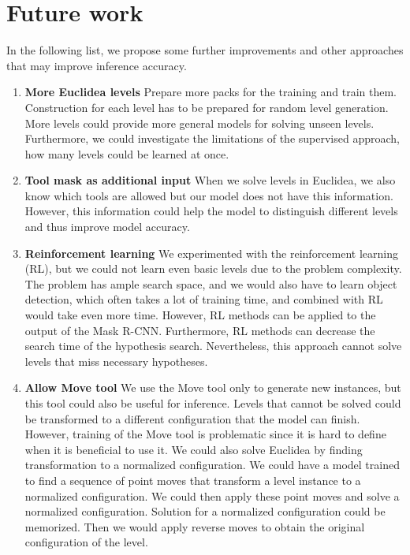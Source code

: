 \section{Future work}
In the following list, we propose some further improvements and other approaches that may improve inference accuracy. 
\begin{enumerate}
    \item \textbf{More Euclidea levels}\newline
    Prepare more packs for the training and train them. Construction for each level has to be prepared for random level generation. More levels could provide more general models for solving unseen levels. Furthermore, we could investigate the limitations of the supervised approach, how many levels could be learned at once.
    \item \textbf{Tool mask as additional input}\newline
    When we solve levels in Euclidea, we also know which tools are allowed but our model does not have this information. However, this information could help the model to distinguish different levels and thus improve model accuracy. 
    \item \textbf{Reinforcement learning}\newline
     We experimented with the reinforcement learning (RL), but we could not learn even basic levels due to the problem complexity. The problem has ample search space, and we would also have to learn object detection, which often takes a lot of training time, and combined with RL would take even more time. However, RL methods can be applied to the output of the Mask {R-CNN}. Furthermore, RL methods can decrease the search time of the hypothesis search. Nevertheless, this approach cannot solve levels that miss necessary hypotheses.
    \item \textbf{Allow Move tool}\newline
    We use the Move tool only to generate new instances, but this tool could also be useful for inference. Levels that cannot be solved could be transformed to a different configuration that the model can finish. However, training of the Move tool is problematic since it is hard to define when it is beneficial to use it.
    \newline
   We could also solve Euclidea by finding transformation to a normalized configuration. We could have a model trained to find a sequence of point moves that transform a level instance to a normalized configuration. We could then apply these point moves and solve a normalized configuration. Solution for a normalized configuration could be memorized.  Then we would apply reverse moves to obtain the original configuration of the level.
    
    
\end{enumerate}
